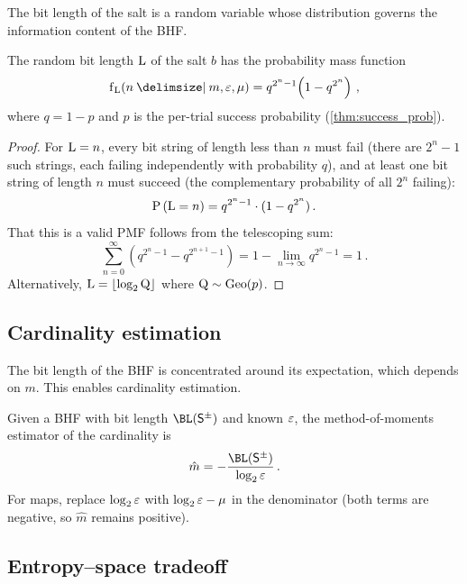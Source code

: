 The bit length of the salt is a random variable whose distribution governs the
information content of the BHF.

\begin{theorem}
\label{thm:L_pmf}
The random bit length $\mathrm{L}$ of the salt $b$ has the probability mass
function
\begin{equation}
\label{eq:L_pmf}
    \PDF{n \Given m, \fprate, \mu}[\RV{L}]
        = q^{2^n - 1}\!\left(1 - q^{2^n}\right)\,,
\end{equation}
where $q = 1 - p$ and $p$ is the per-trial success probability
(\cref{thm:success_prob}).
\end{theorem}
\begin{proof}
For $\mathrm{L} = n$, every bit string of length less than $n$ must fail
(there are $2^n - 1$ such strings, each failing independently with
probability $q$), and at least one bit string of length $n$ must succeed
(the complementary probability of all $2^n$ failing):
\begin{equation}
    \Prob{\RV{L} = n} = q^{2^n - 1} \cdot (1 - q^{2^n})\,.
\end{equation}
That this is a valid PMF follows from the telescoping sum:
\begin{equation}
    \sum_{n=0}^{\infty} \left(q^{2^n - 1} - q^{2^{n+1} - 1}\right)
    = 1 - \lim_{n \to \infty} q^{2^n - 1} = 1\,.
\end{equation}
Alternatively, $\mathrm{L} = \lfloor \log_2 \mathrm{Q} \rfloor$ where
$\mathrm{Q} \sim \mathrm{Geo}(p)$.
\end{proof}

\subsection{Cardinality estimation}

The bit length of the BHF is concentrated around its expectation, which
depends on $m$.
This enables cardinality estimation.

Given a BHF with bit length $\BL(\ASet{S})$ and known $\varepsilon$, the
method-of-moments estimator of the cardinality is
\begin{equation}
    \hat{m} = -\frac{\BL(\ASet{S})}{\log_2 \fprate}\,.
\end{equation}
For maps, replace $\log_2 \varepsilon$ with $\log_2 \varepsilon - \mu$ in the
denominator (both terms are negative, so $\hat{m}$ remains positive).

\subsection{Entropy--space tradeoff}

